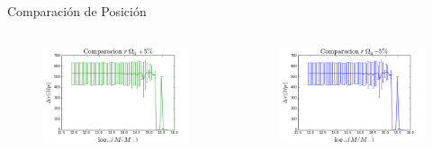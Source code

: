 \documentclass{beamer}
\begin{document}
\begin{frame}{Comparación de Posición}
	\begin{columns}
		\begin{column}{0.5\textwidth}
			\begin{figure}[!h]
			\begin{center}
				\includegraphics[width=\textwidth]{im/logm-deltap-mas}
				\label{fig:p1}
			\end{center}
		\end{figure}
		\end{column}
		
		\begin{column}{0.5\textwidth}
			\begin{figure}[!h]
			\begin{center}
				\includegraphics[width=\textwidth]{im/logm-deltap-menos}
				\label{fig:p2}
			\end{center}
		\end{figure}
		\end{column}
	\end{columns}
\end{frame}
\end{document}
